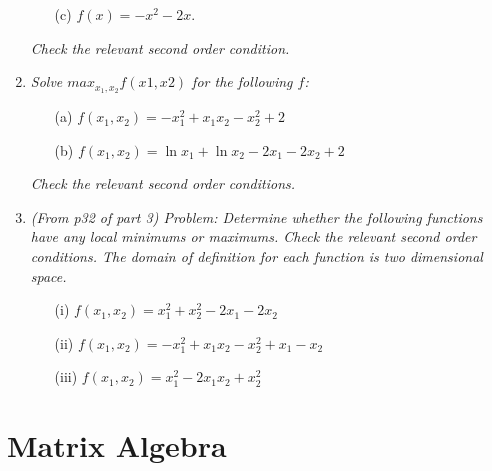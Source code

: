 \documentclass[10pt]{article}
\begin{document}
\begin{enumerate}
\begin{itemize}
    \item[(c)] $f(x) = -x^2 - 2x$.
    \end{itemize}
    \textit{Check the relevant second order condition.} 
\item \textit{Solve $max_{x_1, x_2} f(x1, x2)$ for the following $f$:}
    \begin{itemize}
    \item[(a)]  $f(x_1, x_2) = -x_1^2 + x_1 x_2 - x_2^2 + 2$
    \item[(b)] $f(x_1, x_2) = \ln x_1 + \ln x_2 - 2x_1 - 2x_2 + 2$
    \end{itemize}
    \textit{Check the relevant second order conditions.}
  \item \textit{(From p32 of part 3) Problem: Determine whether the
      following functions have any local minimums or maximums.  Check
      the relevant second order conditions.  The domain of definition
      for each function is two dimensional space. }
  \begin{itemize}
  \item[(i)]  $f(x_1,x_2) =  x_1^2 + x_2^2 -2 x_1 - 2x_2 $
  \item[(ii)]  $f(x_1,x_2) =  - x_1^2 + x_1 x_2 -x_2^2 + x_1 - x_2$
  \item[(iii)] $f(x_1,x_2) = x_1^2 - 2x_1 x_2 + x_2^2$
  \end{itemize}
\end{enumerate}

\section{Matrix Algebra}
\end{document}
